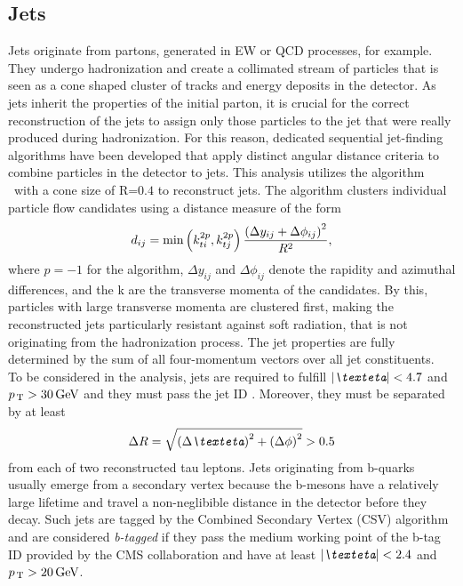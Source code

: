\subsection{Jets}
Jets originate from partons, generated in EW or QCD processes, for example. They undergo hadronization and create a collimated stream of particles that is seen as a cone shaped cluster of tracks and energy deposits in the detector.
As jets inherit the properties of the initial parton, it is crucial for the correct reconstruction of the jets to assign only those particles to the
jet that were really produced during hadronization. For this reason, dedicated sequential jet-finding algorithms have been developed that 
apply distinct angular distance criteria to combine particles in the detector to jets.
This analysis utilizes the \antikt{} algorithm \cite{antikt} with a cone size of $\text{R=0.4}$ to reconstruct jets. The algorithm clusters
individual particle flow candidates using a distance measure of the form 
\begin{equation}
    d_{ij} = \text{min}\left( k_{ti}^{2p}, k_{tj}^{2p} \right) \frac{\left( \Delta y_{ij} + \Delta \phi_{ij} \right)^2}{R^2},
\end{equation}
where $p=-1$ for the \antikt{} algorithm, $\Delta y_{ij}$ and $\Delta \phi_{ij}$ denote the rapidity and azimuthal differences, and the k are the transverse momenta of the candidates.
By this, particles with large transverse momenta are clustered first, making the reconstructed jets particularly resistant against soft radiation, that is not originating from the hadronization process.
The jet properties are fully determined by the sum of all four-momentum vectors over all jet constituents. \\
To be considered in the analysis, jets are required to fulfill $\abs{\eta}<\text{4.7}$ and $p_\text{\,T}>\text{30\,{GeV}}$ and they must pass the jet ID \cite{CMS-AN-17-074}. Moreover, they must be separated by at least 
\begin{equation}
    \Delta R = \sqrt{\li \Delta\eta \re^2 + \li \Delta\phi \re^2} > \text{0.5}
\end{equation} 
from each of two reconstructed tau leptons. 
Jets originating from b-quarks usually emerge from a secondary vertex because the b-mesons have a relatively large lifetime and travel a non-neglibible distance in the detector before they decay.
Such jets are tagged by the Combined Secondary Vertex (CSV) algorithm and are considered \textit{b-tagged} if they pass the medium working point of the
b-tag ID provided by the CMS collaboration and have at least $\abs{\eta}<\text{2.4}$ and $p_\text{\,T}>20\, \text{GeV}$.

